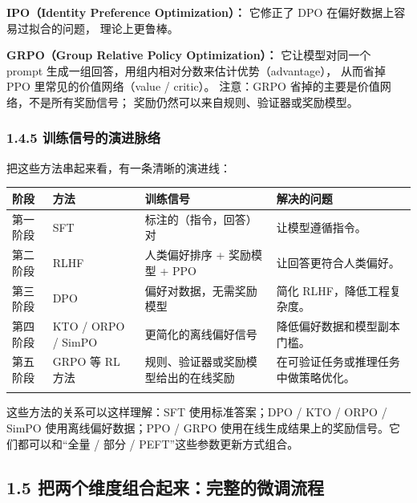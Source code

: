 \documentclass[
  chinese,
]{ctexart}
\begin{document}
\textbf{IPO（Identity Preference Optimization）：} 它修正了 DPO
在偏好数据上容易过拟合的问题， 理论上更鲁棒。

\textbf{GRPO（Group Relative Policy Optimization）：} 它让模型对同一个
prompt 生成一组回答，用组内相对分数来估计优势（advantage）， 从而省掉
PPO 里常见的价值网络（value / critic）。 注意：GRPO
省掉的主要是价值网络，不是所有奖励信号；
奖励仍然可以来自规则、验证器或奖励模型。

\subsubsection{1.4.5
训练信号的演进脉络}\label{ux8badux7ec3ux4fe1ux53f7ux7684ux6f14ux8fdbux8109ux7edc}

把这些方法串起来看，有一条清晰的演进线：

\begin{center}
\begin{tabular}{@{}>{\raggedright\arraybackslash}p{} >{\raggedright\arraybackslash}p{} >{\raggedright\arraybackslash}p{} >{\raggedright\arraybackslash}p{}@{}}
\toprule\noalign{}
阶段 & 方法 & 训练信号 & 解决的问题 \\
\midrule\noalign{}
第一阶段 & SFT & 标注的（指令，回答）对 & 让模型遵循指令。 \\
第二阶段 & RLHF & 人类偏好排序 + 奖励模型 + PPO & 让回答更符合人类偏好。 \\
第三阶段 & DPO & 偏好对数据，无需奖励模型 & 简化 RLHF，降低工程复杂度。 \\
第四阶段 & KTO / ORPO / SimPO & 更简化的离线偏好信号 & 降低偏好数据和模型副本门槛。 \\
第五阶段 & GRPO 等 RL 方法 & 规则、验证器或奖励模型给出的在线奖励 & 在可验证任务或推理任务中做策略优化。 \\
\bottomrule\noalign{}
\end{tabular}
\end{center}

这些方法的关系可以这样理解：SFT 使用标准答案；DPO / KTO / ORPO / SimPO
使用离线偏好数据；PPO / GRPO
使用在线生成结果上的奖励信号。它们都可以和``全量 / 部分 /
PEFT''这些参数更新方式组合。

\subsection{1.5
把两个维度组合起来：完整的微调流程}\label{ux628aux4e24ux4e2aux7ef4ux5ea6ux7ec4ux5408ux8d77ux6765ux5b8cux6574ux7684ux5faeux8c03ux6d41ux7a0b}
\end{document}

